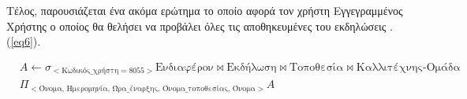Τέλος, παρουσιάζεται ένα ακόμα ερώτημα το οποίο αφορά τον χρήστη
Εγγεγραμμένος Χρήστης ο οποίος θα θελήσει να προβάλει όλες τις
αποθηκευμένες του εκδηλώσεις . (\ref{eq6}).


\begin{equation}
  \label{eq6}
  \begin{split}
    &A \leftarrow \sigma_{<\text{Κωδικός\_χρήστη} = 8055>}
    \text{Ενδιαφέρον} \bowtie \text{Εκδήλωση} \bowtie \text{Τοποθεσία}
    \bowtie \text{Καλλιτέχνης-Ομάδα} \\
    &\Pi_{<\text{Όνομα, Ημερομηνία, Ώρα\_έναρξης, Όνομα\_τοποθεσίας,
        Όνομα}>}A
  \end{split}
\end{equation}










